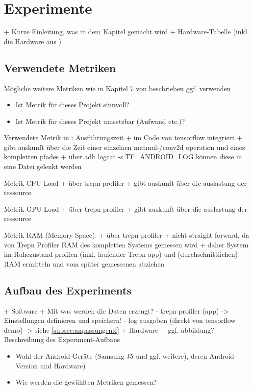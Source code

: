 \section{Experimente}
\label{sec:experimente}
+ Kurze Einleitung, was in dem Kapitel gemacht wird
+ Hardware-Tabelle (inkl. die Hardware aus \cite{rstensorflow2017})

\subsection{Verwendete Metriken}
\label{subsec:metriken}
Mögliche weitere Metriken wie in Kapitel 7 von \cite{deepmon2017} beschrieben ggf. verwenden
\begin{itemize}
	\item{Ist Metrik für dieses Projekt sinnvoll?}
	\item{Ist Metrik für dieses Projekt umsetzbar (Aufwand etc.)?}
\end{itemize}

Verwendete Metrik in \cite{rstensorflow2017}: Ausführungszeit
	+ im Code von tensorflow integriert 
	+ gibt auskunft über die Zeit einer einzelnen matmul-/conv2d operation und eines kompletten pfades
	+ über adb logcat -s TF\_ANDROID\_LOG können diese in eine Datei gelenkt werden

Metrik CPU Load
	+ über trepn profiler
	+ gibt auskunft über die auslastung der ressource
	
Metrik GPU Load
	+ über trepn profiler
	+ gibt auskunft über die auslastung der ressource

Metrik RAM (Memory Space):
	+ über trepn profiler
	+ nicht straight forward, da von Trepn Profiler RAM des kompletten Systems gemessen wird
	+ daher System im Ruhezustand profilen (inkl. laufender Trepn app) und (durchschnittlichen) RAM ermitteln und vom später gemessenen abziehen

\subsection{Aufbau des Experiments}
\label{subsec:aufbauexperiment}
+ Software
	+ Mit was werden die Daten erzeugt?
		- trepn profiler (app) -> Einstellungen definieren und speichern!
		- log ausgaben (direkt von tensorflow demo) -> siehe \ref{subsec:anpassungentf}
+ Hardware
	+ ggf. abbildung?
Beschreibung des Experiment-Aufbaus
\begin{itemize}
	\item{Wahl der Android-Geräte (Samsung J5 und ggf. weitere), deren Android-Version und Hardware)}
	\item{Wie werden die gewählten Metriken gemessen?}
\end{itemize}

